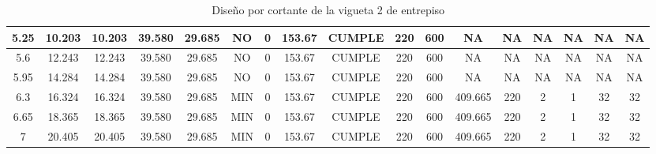 \begin{table}[H]
{\begin{tabular}{|c|c|c|c|c|c|c|c|c|c|c|c|c|c|c|c|c|}
    \hline
    5.25 & 10.203 & 10.203 & 39.580 & 29.685 & NO  & 0   & 153.67 & CUMPLE & 220 & 600 & NA  & NA  & NA  & NA  & NA  & NA \bigstrut\\
    \hline
    5.6 & 12.243 & 12.243 & 39.580 & 29.685 & NO  & 0   & 153.67 & CUMPLE & 220 & 600 & NA  & NA  & NA  & NA  & NA  & NA \bigstrut\\
    \hline
    5.95 & 14.284 & 14.284 & 39.580 & 29.685 & NO  & 0   & 153.67 & CUMPLE & 220 & 600 & NA  & NA  & NA  & NA  & NA  & NA \bigstrut\\
    \hline
    6.3 & 16.324 & 16.324 & 39.580 & 29.685 & MIN & 0   & 153.67 & CUMPLE & 220 & 600 & 409.665 & 220 & 2   & 1   & 32  & 32 \bigstrut\\
    \hline
    6.65 & 18.365 & 18.365 & 39.580 & 29.685 & MIN & 0   & 153.67 & CUMPLE & 220 & 600 & 409.665 & 220 & 2   & 1   & 32  & 32 \bigstrut\\
    \hline
    7   & 20.405 & 20.405 & 39.580 & 29.685 & MIN & 0   & 153.67 & CUMPLE & 220 & 600 & 409.665 & 220 & 2   & 1   & 32  & 32 \bigstrut\\
    \hline
    
    \end{tabular}}%
    \caption{Diseño por cortante de la vigueta 2 de entrepiso}
  \label{tab:CORT VT2 EP}%
\end{table}%
